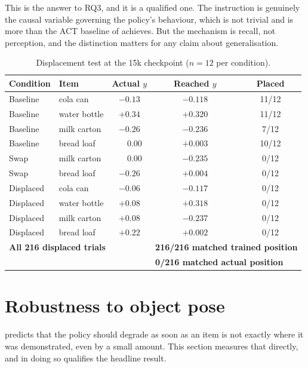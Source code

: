 This is the answer to RQ3, and it is a qualified one. The instruction is genuinely the
causal variable governing the policy's behaviour, which is not trivial and is more than
the ACT baseline of  achieves. But the mechanism is recall, not
perception, and the distinction matters for any claim about generalisation.

\begin{table}[ht]
\caption{Displacement test at the 15k checkpoint ($n=12$ per condition).}
\begin{center}
\begin{tabular}{llccc}
\toprule
Condition & Item & Actual $y$ & Reached $y$ & Placed \\
\midrule
Baseline  & cola can     & $-0.13$ & $-0.118$ & 11/12 \\
Baseline  & water bottle & $+0.34$ & $+0.320$ & 11/12 \\
Baseline  & milk carton  & $-0.26$ & $-0.236$ & 7/12 \\
Baseline  & bread loaf   & $\phantom{-}0.00$ & $+0.003$ & 10/12 \\
\midrule
Swap      & milk carton  & $\phantom{-}0.00$ & $-0.235$ & 0/12 \\
Swap      & bread loaf   & $-0.26$ & $+0.004$ & 0/12 \\
\midrule
Displaced & cola can     & $-0.06$ & $-0.117$ & 0/12 \\
Displaced & water bottle & $+0.08$ & $+0.318$ & 0/12 \\
Displaced & milk carton  & $+0.08$ & $-0.237$ & 0/12 \\
Displaced & bread loaf   & $+0.22$ & $+0.002$ & 0/12 \\
\midrule
\multicolumn{3}{l}{\textbf{All 216 displaced trials}} &
\multicolumn{2}{l}{\textbf{216/216 matched trained position}} \\
\multicolumn{3}{l}{} & \multicolumn{2}{l}{\textbf{0/216 matched actual position}} \\
\bottomrule
\end{tabular}
\end{center}
\label{tab:lookup}
\end{table}

\section{Robustness to object pose}
\label{sec:results-robustness}
 predicts that the policy should degrade as soon as an item
is not exactly where it was demonstrated, even by a small amount. This section measures
that directly, and in doing so qualifies the headline result.

